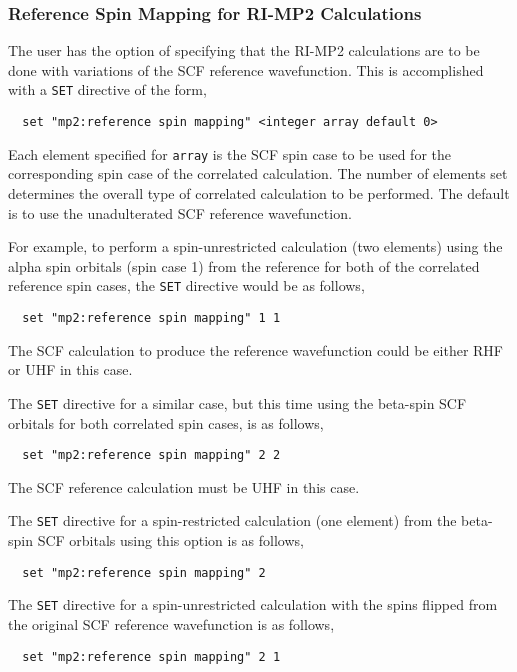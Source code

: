 \subsubsection{Reference Spin Mapping for RI-MP2 Calculations}

The user has the option of specifying that the RI-MP2 calculations are
to be done with variations of the SCF reference wavefunction.  This is
accomplished with a \verb+SET+ directive of the form,

\begin{verbatim}
  set "mp2:reference spin mapping" <integer array default 0>
\end{verbatim}

Each element specified for \verb+array+ is the SCF spin case to be
used for the corresponding spin case of the correlated calculation.
The number of elements set determines the overall type of correlated
calculation to be performed.  The default is to use the unadulterated
SCF reference wavefunction.

For example, to perform a spin-unrestricted calculation (two elements)
using the alpha spin orbitals (spin case 1) from the reference for
both of the correlated reference spin cases, the \verb+SET+ directive
would be as follows,
\begin{verbatim}
  set "mp2:reference spin mapping" 1 1
\end{verbatim}
The SCF calculation to produce the reference wavefunction could be either
RHF or UHF in this case.

The \verb+SET+ directive for a similar case, but this time using the
beta-spin SCF orbitals for both correlated spin cases, is as follows,
\begin{verbatim}
  set "mp2:reference spin mapping" 2 2
\end{verbatim}
The SCF reference calculation must be UHF in this case.

The \verb+SET+ directive for a spin-restricted calculation (one
element) from the beta-spin SCF orbitals using this option is as
follows,
\begin{verbatim}
  set "mp2:reference spin mapping" 2
\end{verbatim}

The \verb+SET+ directive for a spin-unrestricted calculation with the
spins flipped from the original SCF reference wavefunction is as
follows,
\begin{verbatim}
  set "mp2:reference spin mapping" 2 1
\end{verbatim}


